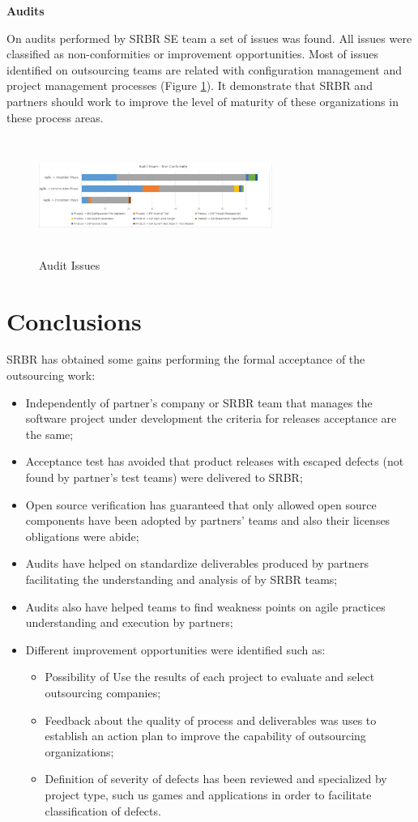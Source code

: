 \textbf{Audits}

On audits performed by SRBR SE team a set of issues was found. All issues were classified as non-conformities or improvement opportunities. Most of issues identified on outsourcing teams are related with configuration management and project management processes (Figure \ref{fig:audit}). It demonstrate that SRBR and partners should work to improve the level of maturity of these organizations in these process areas.

\begin{figure}[!h]
\includegraphics[height=1.5in, width=3in]{Audit}
\caption{Audit Issues}
\label{fig:audit}
\end{figure}

\section{Conclusions}
SRBR has obtained some gains performing the formal acceptance of the outsourcing work: 
\begin{itemize}
\item Independently of partner's company or SRBR team that manages the software project under development the criteria for releases acceptance are the same;
\item Acceptance test has avoided that product releases with escaped defects (not found by partner's test teams) were delivered to SRBR; 
\item Open source verification has guaranteed that only allowed open source components have been adopted by partners' teams and also their licenses obligations were abide; 
\item Audits have helped on standardize deliverables produced by partners facilitating the understanding and analysis of by SRBR teams;
\item Audits also have helped teams to find weakness points on agile practices understanding and execution by partners;
\item Different improvement opportunities were identified such as:
	\begin{itemize}
	\item Possibility of Use the results of each project to evaluate and select outsourcing companies;
	\item Feedback about the quality of process and deliverables was uses to establish an action plan to improve the capability of outsourcing organizations;
	\item Definition of severity of defects has been reviewed and specialized by project type, such us games and applications in order to facilitate classification of defects.
    \end{itemize}
\end{itemize}
